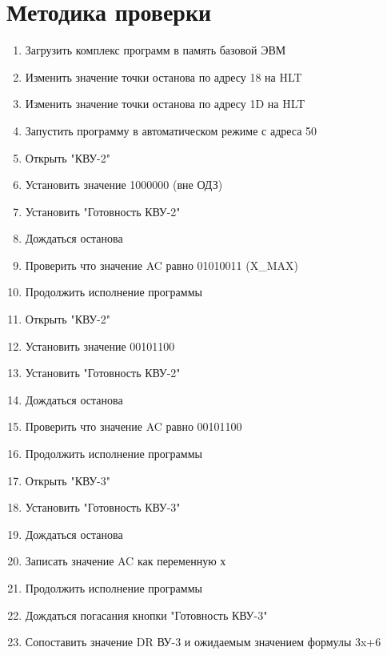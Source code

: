 \documentclass[12pt]{article}
\begin{document}
	\section{Методика проверки}
	\begin{enumerate}[]
		\item Загрузить комплекс программ в память базовой ЭВМ
		\item Изменить значение точки останова по адресу 18 на HLT
		\item Изменить значение точки останова по адресу 1D на HLT
		\item Запустить программу в автоматическом режиме с адреса 50
		\item Открыть "КВУ-2"
		\item Установить значение 1000000 (вне ОДЗ)
		\item Установить "Готовность КВУ-2"
		\item Дождаться останова
		\item Проверить что значение AC равно 01010011 (X_MAX)
		\item Продолжить исполнение программы
		\item Открыть "КВУ-2"
		\item Установить значение 00101100
		\item Установить "Готовность КВУ-2"
		\item Дождаться останова
		\item Проверить что значение AC равно 00101100
		\item Продолжить исполнение программы
		\item Открыть "КВУ-3"
		\item Установить "Готовность КВУ-3"
		\item Дождаться останова
		\item Записать значение AC как переменную х
		\item Продолжить исполнение программы
		\item Дождаться погасания кнопки "Готовность КВУ-3"
		\item Сопоставить значение DR ВУ-3 и ожидаемым значением формулы 3x+6
	 \end{enumerate}
\end{document}

